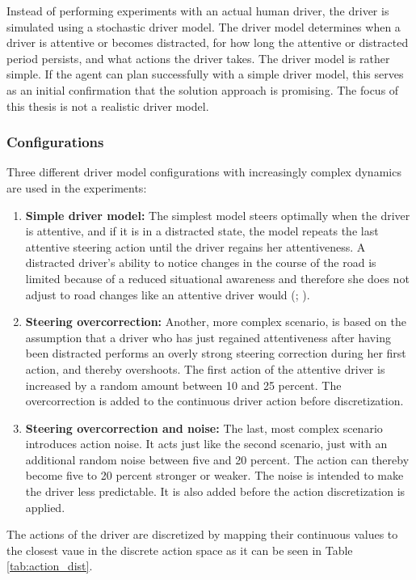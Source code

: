 Instead of performing experiments with an actual human driver, the driver is simulated using a stochastic driver model. The driver model determines when a driver is attentive or becomes distracted, for how long the attentive or distracted period persists, and what actions the driver takes. The driver model is rather simple. If the agent can plan successfully with a simple driver model, this serves as an initial confirmation that the solution approach is promising. The focus of this thesis is not a realistic driver model.


\subsubsection{Configurations}
\label{sec:driver_model_config}

Three different driver model configurations with increasingly complex dynamics are used in the experiments:
\begin{enumerate}
    \item \textbf{Simple driver model:} The simplest model steers optimally when the driver is attentive, and if it is in a distracted state, the model repeats the last attentive steering action until the driver regains her attentiveness. A distracted driver's ability to notice changes in the course of the road is limited because of a reduced situational awareness and therefore she does not adjust to road changes like an attentive driver would (\cite{driver-awareness}; \cite{driver-awareness2}).
    \item \textbf{Steering overcorrection:} Another, more complex scenario, is based on the assumption that a driver who has just regained attentiveness after having been distracted performs an overly strong steering correction during her first action, and thereby overshoots. The first action of the attentive driver is increased by a random amount between 10 and 25 percent. The overcorrection is added to the continuous driver action before discretization.
    \item \textbf{Steering overcorrection and noise:} The last, most complex scenario introduces action noise. It acts just like the second scenario, just with an additional random noise between five and 20 percent. The action can thereby become five to 20 percent stronger or weaker. The noise is intended to make the driver less predictable. It is also added before the action discretization is applied.
\end{enumerate}
\label{sec:driver_act_discr}
The actions of the driver are discretized by mapping their continuous values to the closest vaue in the discrete action space as it can be seen in Table \ref{tab:action_dist}.

